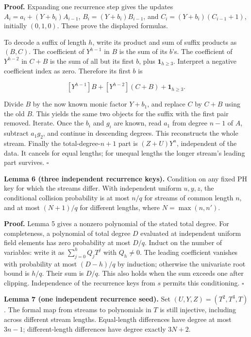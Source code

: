 \documentclass[
  11pt,
]{article}
\begin{document}
\textbf{Proof.} Expanding one recurrence step gives the updates
\(A_i=a_i+(Y+b_i)A_{i-1}\), \(B_i=(Y+b_i)B_{i-1}\), and
\(C_i=(Y+b_i)(C_{i-1}+1)\), initially \((0,1,0)\). These prove the
displayed formulas.

To decode a suffix of length \(h\), write its product and sum of suffix
products as \((B,C)\). The coefficient of \(Y^{h-1}\) in \(B\) is the
sum of its \(b\)'s. The coefficient of \(Y^{h-2}\) in \(C+B\) is the sum
of all but its first \(b\), plus \(\mathbf1_{h\ge3}\). Interpret a
negative coefficient index as zero. Therefore its first \(b\) is

\[ [Y^{h-1}]B+[Y^{h-2}](C+B)+\mathbf1_{h\ge3}. \]

Divide \(B\) by the now known monic factor \(Y+b_1\), and replace \(C\)
by \(C+B\) using the old \(B\). This yields the same two objects for the
suffix with the first pair removed. Iterate. Once the \(b_i\) and
\(g_i\) are known, read \(a_1\) from degree \(n-1\) of \(A\), subtract
\(a_1g_2\), and continue in descending degrees. This reconstructs the
whole stream. Finally the total-degree-\(n+1\) part is \((Z+U)Y^n\),
independent of the data. It cancels for equal lengths; for unequal
lengths the longer stream's leading part survives. \(\square\)

\textbf{Lemma 6 (three independent recurrence keys).} Condition on any
fixed PH key for which the streams differ. With independent uniform
\(u,y,z\), the conditional collision probability is at most \(n/q\) for
streams of common length \(n\), and at most \((N+1)/q\) for different
lengths, where \(N=\max(n,n')\).

\textbf{Proof.} Lemma 5 gives a nonzero polynomial of the stated total
degree. For completeness, a polynomial of total degree \(D\) evaluated
at independent uniform field elements has zero probability at most
\(D/q\). Induct on the number of variables: write it as
\(\sum_{j=0}^h Q_j T^j\) with \(Q_h\ne0\). The leading coefficient
vanishes with probability at most \((D-h)/q\) by induction; otherwise
the univariate root bound is \(h/q\). Their sum is \(D/q\). This also
holds when the sum exceeds one after clipping. Independence of the
recurrence keys from \(s\) permits this conditioning. \(\square\)

\textbf{Lemma 7 (one independent recurrence seed).} Set
\((U,Y,Z)=(T^2,T^3,T)\). The formal map from streams to polynomials in
\(T\) is still injective, including across different stream lengths.
Equal-length differences have degree at most \(3n-1\); different-length
differences have degree exactly \(3N+2\).
\end{document}

